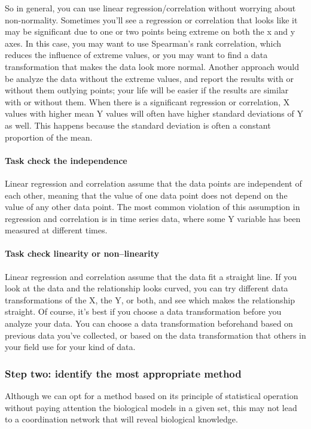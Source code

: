 \documentclass[a4paper]{article}
\begin{document}
So in general, you can use linear regression/correlation without worrying about non-normality.
Sometimes you'll see a regression or correlation that looks like it may be significant due to one or two points being extreme on both the x and y axes. In this case, you may want to use Spearman's rank correlation, which reduces the influence of extreme values, or you may want to find a data transformation that makes the data look more normal. Another approach would be analyze the data without the extreme values, and report the results with or without them outlying points; your life will be easier if the results are similar with or without them.
When there is a significant regression or correlation, X values with higher mean Y values will often have higher standard deviations of Y as well. This happens because the standard deviation is often a constant proportion of the mean. 

\paragraph{Task check the independence}
Linear regression and correlation assume that the data points are independent of each other, meaning that the value of one data point does not depend on the value of any other data point. The most common violation of this assumption in regression and correlation is in time series data, where some Y variable has been measured at different times.

\paragraph{Task check linearity or non--linearity}

Linear regression and correlation assume that the data fit a straight line. If you look at the data and the relationship looks curved, you can try different data transformations of the X, the Y, or both, and see which makes the relationship straight. Of course, it's best if you choose a data transformation before you analyze your data. You can choose a data transformation beforehand based on previous data you've collected, or based on the data transformation that others in your field use for your kind of data.

\subsubsection*{Step two: identify the most appropriate method} 
Although we can opt for a method based on its principle of statistical operation without paying attention the biological models in a given set, this may not lead to a coordination network that will reveal biological knowledge.
\end{document}
